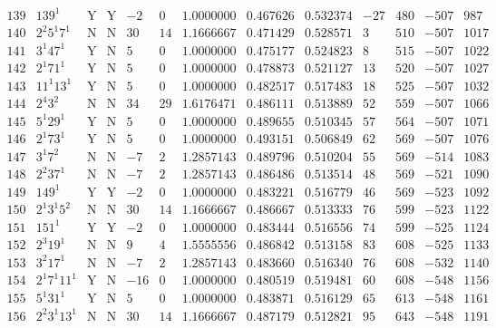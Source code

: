 \documentclass[11pt,reqno,a4letter]{article}
\numberwithin{equation}{section}
\numberwithin{figure}{section}
\numberwithin{table}{section}
\theoremstyle{plain}
\numberwithin{theorem}{section}
\theoremstyle{definition}
\begin{document}
\begin{table}[ht]
\begin{equation*}
{\begin{array}{cc|cc|ccc|cc|cccc}
 139 & 139^1 & \text{Y} & \text{Y} & -2 & 0 & 1.0000000 & 0.467626 & 0.532374 & -27 & 480 & -507 & 987 \\
 140 & 2^2 5^1 7^1 & \text{N} & \text{N} & 30 & 14 & 1.1666667 & 0.471429 & 0.528571 & 3 & 510 & -507 & 1017 \\
 141 & 3^1 47^1 & \text{Y} & \text{N} & 5 & 0 & 1.0000000 & 0.475177 & 0.524823 & 8 & 515 & -507 & 1022 \\
 142 & 2^1 71^1 & \text{Y} & \text{N} & 5 & 0 & 1.0000000 & 0.478873 & 0.521127 & 13 & 520 & -507 & 1027 \\
 143 & 11^1 13^1 & \text{Y} & \text{N} & 5 & 0 & 1.0000000 & 0.482517 & 0.517483 & 18 & 525 & -507 & 1032 \\
 144 & 2^4 3^2 & \text{N} & \text{N} & 34 & 29 & 1.6176471 & 0.486111 & 0.513889 & 52 & 559 & -507 & 1066 \\
 145 & 5^1 29^1 & \text{Y} & \text{N} & 5 & 0 & 1.0000000 & 0.489655 & 0.510345 & 57 & 564 & -507 & 1071 \\
 146 & 2^1 73^1 & \text{Y} & \text{N} & 5 & 0 & 1.0000000 & 0.493151 & 0.506849 & 62 & 569 & -507 & 1076 \\
 147 & 3^1 7^2 & \text{N} & \text{N} & -7 & 2 & 1.2857143 & 0.489796 & 0.510204 & 55 & 569 & -514 & 1083 \\
 148 & 2^2 37^1 & \text{N} & \text{N} & -7 & 2 & 1.2857143 & 0.486486 & 0.513514 & 48 & 569 & -521 & 1090 \\
 149 & 149^1 & \text{Y} & \text{Y} & -2 & 0 & 1.0000000 & 0.483221 & 0.516779 & 46 & 569 & -523 & 1092 \\
 150 & 2^1 3^1 5^2 & \text{N} & \text{N} & 30 & 14 & 1.1666667 & 0.486667 & 0.513333 & 76 & 599 & -523 & 1122 \\
 151 & 151^1 & \text{Y} & \text{Y} & -2 & 0 & 1.0000000 & 0.483444 & 0.516556 & 74 & 599 & -525 & 1124 \\
 152 & 2^3 19^1 & \text{N} & \text{N} & 9 & 4 & 1.5555556 & 0.486842 & 0.513158 & 83 & 608 & -525 & 1133 \\
 153 & 3^2 17^1 & \text{N} & \text{N} & -7 & 2 & 1.2857143 & 0.483660 & 0.516340 & 76 & 608 & -532 & 1140 \\
 154 & 2^1 7^1 11^1 & \text{Y} & \text{N} & -16 & 0 & 1.0000000 & 0.480519 & 0.519481 & 60 & 608 & -548 & 1156 \\
 155 & 5^1 31^1 & \text{Y} & \text{N} & 5 & 0 & 1.0000000 & 0.483871 & 0.516129 & 65 & 613 & -548 & 1161 \\
 156 & 2^2 3^1 13^1 & \text{N} & \text{N} & 30 & 14 & 1.1666667 & 0.487179 & 0.512821 & 95 & 643 & -548 & 1191 \\

\end{array}}
\end{equation*}
\end{table}
\end{document}

